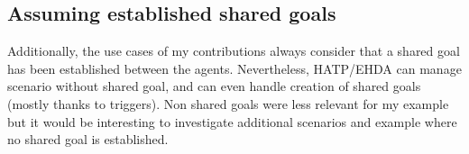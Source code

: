 \subsection*{Assuming established shared goals}

Additionally, the use cases of my contributions always consider that a shared goal has been established between the agents. Nevertheless, HATP/EHDA can manage scenario without shared goal, and can even handle creation of shared goals (mostly thanks to triggers). Non shared goals were less relevant for my example but it would be interesting to investigate additional scenarios and example where no shared goal is established.